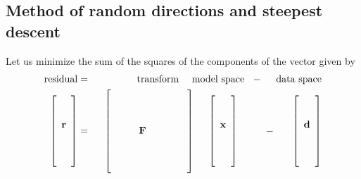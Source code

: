 \subsection{Method of random directions and steepest descent}
 
\par
Let us minimize the sum of the squares of the components
of the  vector given by
\begin{eqnarray}
{\rm residual}
&=&
{\rm 
\hbox{transform} \ \ \  \ \hbox{model space}
\ \ -\ \  \
\ \hbox{data space}
}
        \\                                                                               
\left[
\begin{array}{c}
\, \\
\, \\
\bold r\\
\, \\
\, \\
\,
\end{array}
\right]
       &=&
       \ \ 
\left[
\begin{array}{cccccc}
\, & \,& \,&     \,& \,& \, \\
\, & \,& \,&     \,& \,& \, \\
\, & \,& \,&     \,& \,& \, \\
\, & \,& \bold F \,& \,& \, \\
\, & \,& \,&     \,& \,& \, \\
\, & \,& \,&     \,& \,& \, \\
\, & \,& \,&     \,& \,& \,
\end{array}
  \right]
 \ \ \ \
\left[
\begin{array}{c}
\, \\
\, \\
\bold x\\
\, \\
\, \\
\,
\end{array}
  \right]
  \ \ \ 
\ \ \ \ \ -\ \ \ \ \ 
\left[
\begin{array}{c}
\, \\
\, \\
\bold d\\
\, \\
\, \\
\,
\end{array}
  \right]
\label{eqn:cg1b}
\end{eqnarray}


